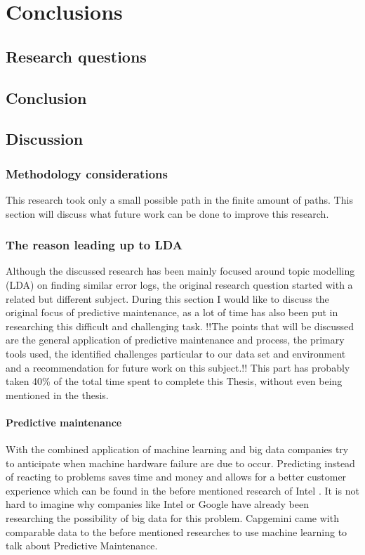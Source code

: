 \chapter{Conclusions} \label{ch:conclusions}

\section{Research questions}


\section{Conclusion}


\section{Discussion}

\subsection {Methodology considerations}
This research took only a small possible path in the finite amount of paths. This section will discuss what future work can be done to improve this research.

\subsection{The reason leading up to LDA}\label{conclusion:discussion}
Although the discussed research has been mainly focused around topic modelling (LDA) on finding similar error logs, the original research question started with a related but different subject. During this section I would like to discuss the original focus of predictive maintenance, as a lot of time has also been put in researching this difficult and challenging task. !!The points that will be discussed are the general application of predictive maintenance and process, the primary tools used, the identified challenges particular to our data set and environment and a recommendation for future work on this subject.!! This part has probably taken 40\% of the total time spent to complete this Thesis, without even being mentioned in the thesis.

\subsubsection{Predictive maintenance}
With the combined application of machine learning and big data companies try to anticipate when machine hardware failure are due to occur. Predicting instead of reacting to problems saves time and money and allows for a better customer experience which can be found in the before mentioned research of Intel \cite{Sipos2014Log-basedMaintenance}\cite{AjayChandramoulyRavindraNarkhedeVijayMungaraGuillermoRueda2013ReducingAnalytics}. It is not hard to imagine why companies like Intel  or Google have already been researching the possibility of big data for this problem. Capgemini came with comparable data to the before mentioned researches to use machine learning to talk about Predictive Maintenance.

